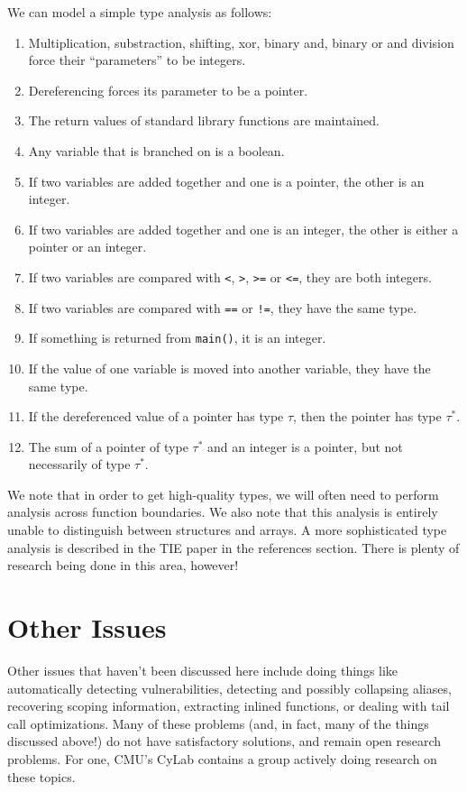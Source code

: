 \documentclass{article}
\begin{document}
We can model a simple type analysis as follows:
\begin{enumerate}
\item Multiplication, substraction, shifting, xor, binary and, binary or
	and division force their ``parameters'' to be integers.
\item Dereferencing forces its parameter to be a pointer.
\item The return values of standard library functions are maintained.
\item Any variable that is branched on is a boolean.
\item If two variables are added together and one is a pointer, the other is an integer.
\item If two variables are added together and one is an integer, the other is either a pointer
	or an integer.
\item If two variables are compared with \verb+<+, \verb+>+, \verb+>=+ or \verb+<=+,
	they are both integers.
\item If two variables are compared with \verb+==+ or \verb+!=+, they have the same type.
\item If something is returned from \verb+main()+, it is an integer.
\item If the value of one variable is moved into another variable, they have the same type.
\item If the dereferenced value of a pointer has type $\tau$, then the pointer has type
	$\tau^*$.
\item The sum of a pointer of type $\tau^*$ and an integer is a pointer, but not necessarily
of type $\tau^*$.
\end{enumerate}

We note that in order to get high-quality types, we will often need to perform analysis across
function boundaries. We also note that this analysis is entirely unable to distinguish between
structures and arrays. A more sophisticated type analysis is described in the TIE paper 
in the references section. There is plenty of research being done in this area, however!
\section{Other Issues}
Other issues that haven't been discussed here include doing things like automatically detecting
vulnerabilities, detecting and possibly collapsing aliases, recovering scoping information,
extracting inlined functions, or dealing with tail call optimizations. Many of these problems (and,
in fact, many of the things discussed above!) do not have satisfactory solutions, and remain open
research problems. For one, CMU's CyLab contains a group actively doing research on these topics.
\end{document}
